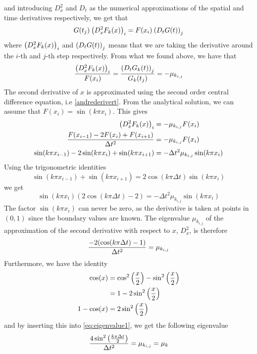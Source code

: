 and introducing \(D_x^2\) and \(D_t\) as the numerical approximations of the spatial and time derivatives respectively, we get that
\[
    G(t_j)\:\qty(D_x^2F_k(x))_i = F(x_i)\:\qty(D_tG(t))_j
\]
where \(\qty(D_x^2F_k(x))_i\) and \(\qty(D_tG(t))_j\) means that we are taking the derivative around the \(i\)-th and \(j\)-th step respectively.
From what we found above, we have that
\begin{equation}\label{eq:discreteRatios}
    \frac{\qty(D_x^2F_k(x))_i }{ F(x_i)} = \frac{\qty(D_tG_k(t))_j}{G_k(t_j)} = -\mu_{k_{i,j}}
\end{equation}
The second derivative of \(x\) is approximated using the second order central difference equation, i.e \vref{andrederivert}.
From the analytical solution, we can assume that \(F(x_i) = \sin(k \pi x_i)\). This gives
\begin{align*}
    \qty(D_x^2F_k(x))_i &= -\mu_{k_{i,j}}F(x_i) \\
    \frac{F(x_{i-1}) -2F(x_i) + F(x_{i+1}) }{\Delta t^2} &= -\mu_{k_{i,j}}F(x_i) \\
    \sin(k\pi x_{i-1}) -2\sin(k\pi x_i) + \sin(k \pi x_{i+1}) &= -\Delta t^2\mu_{k_{i,j}}\sin(k \pi x_i)
\end{align*}
Using the trigonometric identities
\[
    \sin(k\pi x_{i-1}) + \sin(k\pi x_{i+1}) = 2\cos(k\pi \Delta t)\sin(k\pi x_i)
\]
we get
\[
    \sin(k\pi x_i)(2\cos(k\pi \Delta t) - 2) = -\Delta t^2\mu_{k_{i,j}}\sin(k \pi x_i)
\]
The factor \(\sin(k\pi x_i) \) can never be zero, as the derivative is taken at points in \((0,1) \) since the boundary values are known. The eigenvalue \(\mu_{k_{i,j}}\) of the approximation of the second derivative with respect to \(x \), \( D_x^2 \), is therefore
\begin{equation}\label{eq:eigenvalue1}
    \frac{-2\qty(\cos(k\pi \Delta t) - 1)}{\Delta t^2} =\mu_{k_{i,j}}
\end{equation}
Furthermore, we have the identity
\begin{align*}
    \cos(x) &= \cos^2\qty(\frac{x}{2}) - \sin^2\qty(\frac{x}{2}) \\
    &= 1- 2\sin^2\qty(\frac{x}{2}) \\
    1-\cos(x) &= 2\sin^2\qty(\frac{x}{2})
\end{align*}
and by inserting this into \vref{eq:eigenvalue1}, we get the following eigenvalue
\begin{equation} \label{eq:mu}
    \frac{4\sin^2\qty(\frac{k\pi \Delta t}{2})}{\Delta t^2} =\mu_{k_{i,j}} = \mu_k
\end{equation}

